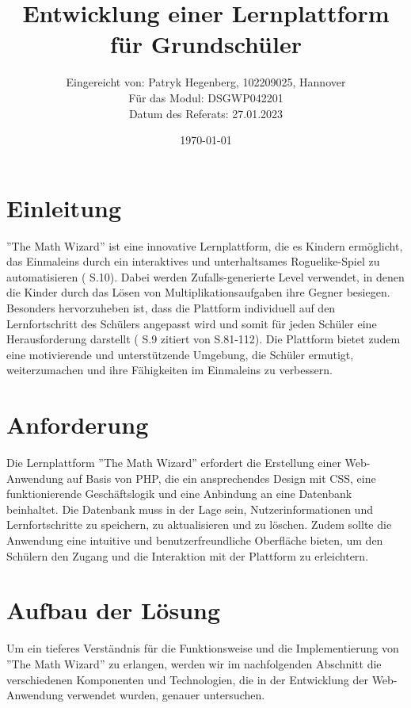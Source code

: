 \documentclass[fontsize:11pt]{article}
\title{Entwicklung einer Lernplattform für Grundschüler}
\author{Eingereicht von: Patryk Hegenberg, 102209025, Hannover\\ Für das Modul: DSGWP042201 \\ Datum des Referats: 27.01.2023}
\date{\today}
\begin{document}
\maketitle
  
\section{Einleitung}
    ''The Math Wizard'' ist eine innovative Lernplattform, die es Kindern ermöglicht, das Einmaleins durch ein interaktives und unterhaltsames Roguelike-Spiel zu automatisieren (\cite{deterding} S.10). Dabei werden Zufalls-generierte Level verwendet, in denen die Kinder durch das Lösen von Multiplikationsaufgaben ihre Gegner besiegen. Besonders hervorzuheben ist, dass die Plattform individuell auf den Lernfortschritt des Schülers angepasst wird und somit für jeden Schüler eine Herausforderung darstellt (\cite{sailer} S.9 zitiert von \cite{hattie} S.81-112). Die Plattform bietet zudem eine motivierende und unterstützende Umgebung, die Schüler ermutigt, weiterzumachen und ihre Fähigkeiten im Einmaleins zu verbessern.
        
\section{Anforderung}
    Die Lernplattform ''The Math Wizard'' erfordert die Erstellung einer Web-Anwendung auf Basis von PHP, die ein ansprechendes Design mit CSS, eine funktionierende Geschäftslogik und eine Anbindung an eine Datenbank beinhaltet. Die Datenbank muss in der Lage sein, Nutzerinformationen und Lernfortschritte zu speichern, zu aktualisieren und zu löschen. Zudem sollte die Anwendung eine intuitive und benutzerfreundliche Oberfläche bieten, um den Schülern den Zugang und die Interaktion mit der Plattform zu erleichtern.
        
\section{Aufbau der Lösung}
    Um ein tieferes Verständnis für die Funktionsweise und die Implementierung von ''The Math Wizard'' zu erlangen, werden wir im nachfolgenden Abschnitt die verschiedenen Komponenten und Technologien, die in der Entwicklung der Web-Anwendung verwendet wurden, genauer untersuchen.
\end{document}
